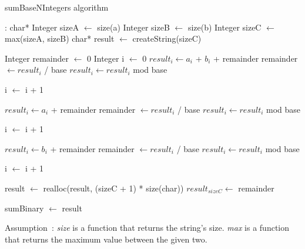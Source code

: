 \documentclass[book, nodocumentinfo]{upmethodology-document}
\begin{document}
\begin{algorithm}[H]
    \label{algo:basenintegerlist-sum-basen-integers}
    \caption{sumBaseNIntegers algorithm}

    \begin{algorithmic}
         : char*
            \State Integer sizeA \(\leftarrow\) size(a)
            \State Integer sizeB \(\leftarrow\) size(b)
            \State Integer sizeC \(\leftarrow\) max(sizeA, sizeB)
            \State char* result \(\leftarrow\) createString(sizeC)

            \State Integer remainder \(\leftarrow\) 0
            \State Integer i \(\leftarrow\) 0
                \State \(result_i \leftarrow a_i\) + \(b_i\) + remainder
                \State remainder \(\leftarrow result_i\) / base
                \State \(result_i \leftarrow result_i\) mod base

                \State i \(\leftarrow\) i + 1
            \EndWhile

                \State \(result_i \leftarrow a_i\) + remainder
                \State remainder \(\leftarrow result_i\) / base
                \State \(result_i \leftarrow result_i\) mod base

                \State i \(\leftarrow\) i + 1
            \EndWhile

                \State \(result_i \leftarrow b_i\) + remainder
                \State remainder \(\leftarrow result_i\) / base
                \State \(result_i \leftarrow result_i\) mod base

                \State i \(\leftarrow\) i + 1
            \EndWhile

                \State result \(\leftarrow\) realloc(result, (sizeC + 1) * size(char))
                \State \(result_{sizeC} \leftarrow\) remainder
            \EndIf

            \State sumBinary \(\leftarrow\) result
        \EndFunction
    \end{algorithmic}
\end{algorithm}

Assumption : \emph{size} is a function that returns the string's size.
\emph{max} is a function that returns the maximum value between the given two.

\end{document}
